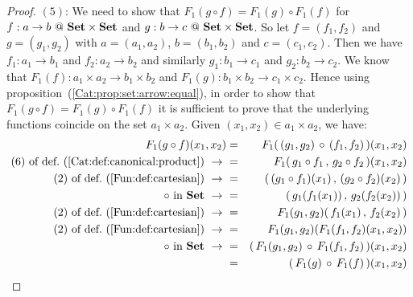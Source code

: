 \begin{proof}
    $(5)$: We need to show that $F_{1}(g\circ f)=F_{1}(g)\circ F_{1}(f)$ for
    $f:a\to b\ @\ \mbox{\bf Set}\times\mbox{\bf Set}$ and $g:b\to c\ @\ \mbox{\bf Set}\times\mbox{\bf Set}$.
    So let $f=(f_{1},f_{2})$ and $g=(g_{1},g_{2})$ with $a=(a_{1},a_{2})$,
    $b=(b_{1},b_{2})$ and $c=(c_{1},c_{2})$. Then we have $f_{1}:a_{1}\to b_{1}$
    and $f_{2}:a_{2}\to b_{2}$ and similarly $g_{1}:b_{1}\to c_{1}$ and
    $g_{2}:b_{2}\to c_{2}$. We know that $F_{1}(f):a_{1}\times a_{2}
    \to b_{1}\times b_{2}$ and $F_{1}(g):b_{1}\times b_{2}\to c_{1}\times c_{2}$.
    Hence using proposition~(\ref{Cat:prop:set:arrow:equal}),
    in order to show that $F_{1}(g\circ f)=F_{1}(g)\circ F_{1}(f)$ it is
    sufficient to prove that the underlying functions coincide on the set
    $a_{1}\times a_{2}$. Given $(x_{1},x_{2})\in a_{1}\times a_{2}$, we have:
        \begin{eqnarray*}F_{1}(g\circ f)(x_{1},x_{2})
            &=&F_{1}(\,(g_{1},g_{2})\,\circ\,(f_{1},f_{2})\,)(x_{1},x_{2})\\
            \mbox{$(6)$ of def.~(\ref{Cat:def:canonical:product})}\ \to\ 
            &=&F_{1}(\,g_{1}\circ f_{1}\,,\,g_{2}\circ f_{2}\,)(x_{1},x_{2})\\
            \mbox{$(2)$ of def.~(\ref{Fun:def:cartesian})}\ \to\ 
            &=&(\,(g_{1}\circ f_{1})(x_{1})\,,\,(g_{2}\circ f_{2})(x_{2})\,)\\
            \mbox{$\circ$ in \Set}\ \to\ 
            &=&(\,g_{1}(f_{1}(x_{1}))\,,\,g_{2}(f_{2}(x_{2}))\,)\\
            \mbox{$(2)$ of def.~(\ref{Fun:def:cartesian})}\ \to\ 
            &=&F_{1}(g_{1},g_{2})(\,f_{1}(x_{1})\,,\,f_{2}(x_{2})\,)\\
            \mbox{$(2)$ of def.~(\ref{Fun:def:cartesian})}\ \to\ 
            &=&F_{1}(g_{1},g_{2})(F_{1}(f_{1},f_{2})(x_{1},x_{2}))\\
            \mbox{$\circ$ in \Set}\ \to\ 
            &=&(\,F_{1}(g_{1},g_{2})\,\circ\,F_{1}(f_{1},f_{2})\,)(x_{1},x_{2})\\
            &=&(\,F_{1}(g)\,\circ\,F_{1}(f)\,)(x_{1},x_{2})\\
        \end{eqnarray*}
\end{proof}

